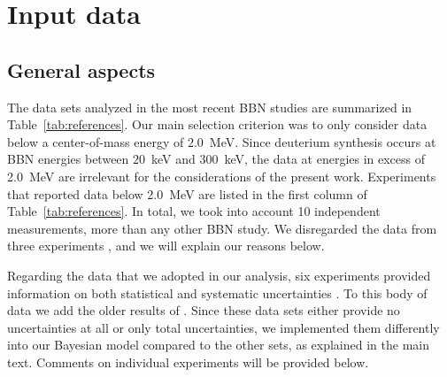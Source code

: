 \documentclass[twocolumn]{aastex63}
\begin{document}
\appendix
\twocolumngrid


\section{Input data}
\label{sec:app}

\subsection{General aspects}
\label{sec:genaspect}
The data sets analyzed in the most recent BBN studies are summarized in Table~\ref{tab:references}. Our main selection criterion was to only consider data below a center-of-mass energy of $2.0$~MeV. Since deuterium synthesis occurs at BBN energies between $20$~keV and $300$~keV, the data at energies in excess of 2.0~MeV are irrelevant for the considerations of the present work. Experiments that reported data below 2.0~MeV are listed in the first column of Table~\ref{tab:references}. In total, we took into account 10 independent measurements, more than any other BBN study. We disregarded the data from three experiments \citep{Wol67,Gel67,Bys08}, and we will explain our reasons below.

Regarding the data that we adopted in our analysis, six experiments provided information on both statistical and systematic uncertainties \citep{War63,Sch97,Ma97,Cas02,Tisma:2019ug,Mossa20}. To this body of data we add the older results of \citet{Gri55,Gri62,Gri63,Bai70}. Since these data sets either provide no uncertainties at all or only total uncertainties, we implemented them differently into our Bayesian model compared to the other sets, as explained in the main text. Comments on individual experiments will be provided below.

\end{document}
